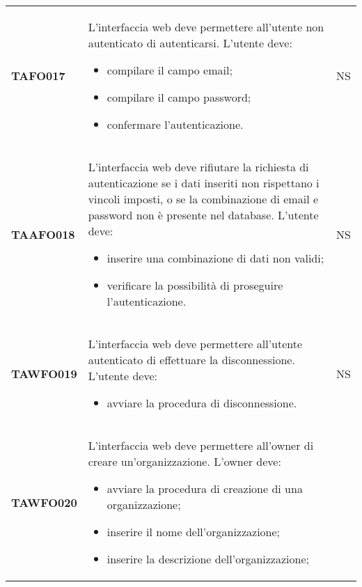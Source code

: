 \documentclass[../piano-di-qualifica.tex]{subfiles}
\begin{document}
\begin{centering}
\begin{longtable}[H]{>{\centering\bfseries}m{3cm} >{}p{10cm} >{\centering\arraybackslash}m{3cm}}

        TAFO017      & L'interfaccia web deve permettere all'utente non autenticato di autenticarsi. \newline
                      L'utente deve:
                      \begin{itemize}
                        \item compilare il campo email;
                        \item compilare il campo password;
                        \item confermare l'autenticazione.
                      \end{itemize}
                      & NS \\
        TAAFO018      & L'interfaccia web deve rifiutare la richiesta di autenticazione se i dati inseriti non rispettano i vincoli imposti, o se la combinazione di email e password non è presente nel database. \newline
                      L'utente deve:
                      \begin{itemize}
                        \item inserire una combinazione di dati non validi;
                        \item verificare la possibilità di proseguire l'autenticazione.
                      \end{itemize}
                      & NS \\
        TAWFO019      & L'interfaccia web deve permettere all'utente autenticato di effettuare la disconnessione. \newline
                      L'utente deve:
                      \begin{itemize}
                      \item avviare la procedura di disconnessione.
                      \end{itemize}
                      & NS \\
        TAWFO020      & L'interfaccia web deve permettere all'owner di creare un'organizzazione. \newline
                      L'owner deve:
                      \begin{itemize}
                      \item avviare la procedura di creazione di una organizzazione;
                      \item inserire il nome dell'organizzazione;
                      \item inserire la descrizione dell'organizzazione;

\end{itemize}
\end{longtable}
\end{centering}
\end{document}
